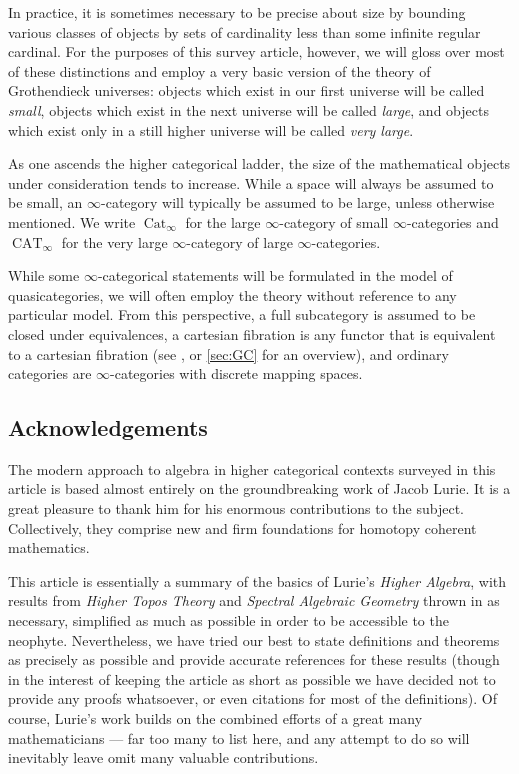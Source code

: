 \documentclass{article}
\theoremstyle{definition}
\renewcommand{\i}{\infty}
\DeclareMathOperator{\Cat}{Cat}
\DeclareMathOperator{\CAT}{CAT}
\begin{document}
In practice, it is sometimes necessary to be precise about size by bounding various classes of objects by sets of cardinality less than some infinite regular cardinal.
For the purposes of this survey article, however, we will gloss over most of these distinctions and employ a very basic version of the theory of Grothendieck universes:
objects which exist in our first universe will be called {\em small}, objects which exist in the next universe will be called {\em large}, and objects which exist only in a still higher universe will be called {\em very large}.

As one ascends the higher categorical ladder, the size of the mathematical objects under consideration tends to increase.
While a space will always be assumed to be small, an $\infty$-category will typically be assumed to be large, unless otherwise mentioned.
 We write $\Cat_\i$
\index{$\Cat_\i$}
for the large $\i$-category of small $\i$-categories and $\CAT_\i$
\index{$\CAT_\i$}
for the very large $\i$-category of large $\i$-categories.

While some $\infty$-categorical statements will be formulated in the model of quasicategories, we will often employ the theory without reference to any particular model.
From this perspective, a full subcategory is assumed to be closed under equivalences, a cartesian fibration is any functor that is equivalent to a cartesian fibration (see \cite[Section 2.4]{HTT}, or \autoref{sec:GC} for an overview), and ordinary categories are $\infty$-categories with discrete mapping spaces.

\subsection{Acknowledgements}

The modern approach to algebra in higher categorical contexts surveyed in this article is based almost entirely on the groundbreaking work of Jacob Lurie.
It is a great pleasure to thank him for his enormous contributions to the subject.
Collectively, they comprise new and firm foundations for homotopy coherent mathematics.

This article is essentially a summary of the basics of Lurie's {\em Higher Algebra}, with results from {\em Higher Topos Theory} and {\em Spectral Algebraic Geometry} thrown in as necessary, simplified as much as possible in order to be accessible to the neophyte.
Nevertheless, we have tried our best to state definitions and theorems as precisely as possible and provide accurate references for these results (though in the interest of keeping the article as short as possible we have decided not to provide any proofs whatsoever, or even citations for most of the definitions).
Of course, Lurie's work builds on the combined efforts of a great many mathematicians --- far too many to list here, and any attempt to do so will inevitably leave omit many valuable contributions.
\end{document}
